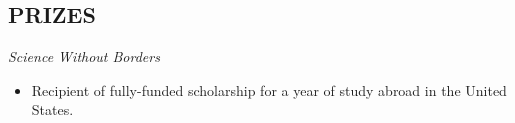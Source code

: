 \documentclass[margin]{res}
\begin{document}
\begin{resume}
	
		\section{PRIZES}
			{\sl Science Without Borders}
			\begin{itemize}
				\item[] Recipient of fully-funded scholarship for a year of study abroad in the United States.
			\end{itemize}


\end{resume}
\end{document}
